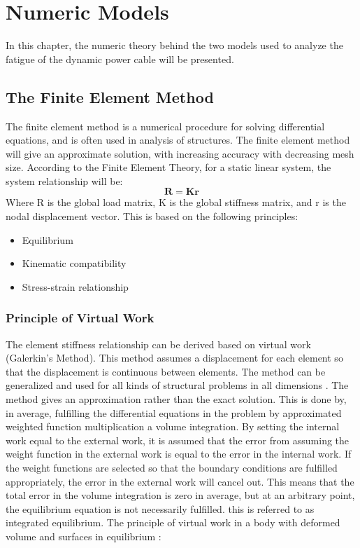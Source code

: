 \chapter{Numeric Models}
\label{chap:numeric}
In this chapter, the numeric theory behind the two models used to analyze the fatigue of the dynamic power cable will be presented.

\section{The Finite Element Method}
The finite element method is a numerical procedure for solving differential equations, and is often used in analysis of structures. The finite element method will give an approximate solution, with increasing accuracy with decreasing mesh size. According to the Finite Element Theory, for a static linear system, the system relationship will be:
\begin{equation}
    \boldsymbol{R}= \boldsymbol{K}\boldsymbol{r}
\end{equation}
Where R is the global load matrix, K is the global stiffness matrix, and r is the nodal displacement vector.\newline
\newline
This is based on the following principles:
\begin{itemize}
    \item Equilibrium
    \item Kinematic compatibility
    \item Stress-strain relationship
\end{itemize}
 \cite{moan2003}
\subsection{Principle of Virtual Work}
The element stiffness relationship can be derived based on virtual work (Galerkin's Method). This method assumes a displacement for each element so that the displacement is continuous between elements. The method can be generalized and used for all kinds of structural problems in all dimensions \cite{moan2003}. The method gives an approximation rather than the exact solution. This is done by,  in average, fulfilling the differential equations in the problem by approximated weighted function multiplication a volume integration. By setting the internal work equal to the external work, it is assumed that the error from assuming the weight function in the external work is equal to the error in the internal work. If the weight functions are selected so that the boundary conditions are fulfilled appropriately, the error in the external work will cancel out. This means that the total error in the volume integration is zero in average, but at an arbitrary point, the equilibrium equation is not necessarily fulfilled. this is referred to as integrated equilibrium. The principle of virtual work in a body with deformed volume and surfaces in equilibrium :   

